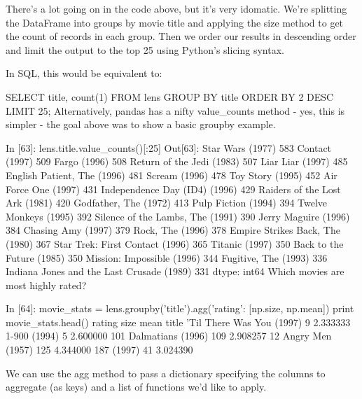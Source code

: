 \documentclass[11pt]{article} %
\begin{document}
There's a lot going on in the code above, but it's very idomatic. We're splitting the DataFrame into groups by movie title and applying the size method to get the count of records in each group. Then we order our results in descending order and limit the output to the top 25 using Python's slicing syntax.

In SQL, this would be equivalent to:

SELECT title, count(1)
FROM lens
GROUP BY title
ORDER BY 2 DESC
LIMIT 25;
Alternatively, pandas has a nifty value_counts method - yes, this is simpler - the goal above was to show a basic groupby example.

In [63]:
lens.title.value_counts()[:25]
Out[63]:
Star Wars (1977)                             583
Contact (1997)                               509
Fargo (1996)                                 508
Return of the Jedi (1983)                    507
Liar Liar (1997)                             485
English Patient, The (1996)                  481
Scream (1996)                                478
Toy Story (1995)                             452
Air Force One (1997)                         431
Independence Day (ID4) (1996)                429
Raiders of the Lost Ark (1981)               420
Godfather, The (1972)                        413
Pulp Fiction (1994)                          394
Twelve Monkeys (1995)                        392
Silence of the Lambs, The (1991)             390
Jerry Maguire (1996)                         384
Chasing Amy (1997)                           379
Rock, The (1996)                             378
Empire Strikes Back, The (1980)              367
Star Trek: First Contact (1996)              365
Titanic (1997)                               350
Back to the Future (1985)                    350
Mission: Impossible (1996)                   344
Fugitive, The (1993)                         336
Indiana Jones and the Last Crusade (1989)    331
dtype: int64
Which movies are most highly rated?

In [64]:
movie_stats = lens.groupby('title').agg({'rating': [np.size, np.mean]})
print movie_stats.head()
                           rating          
                             size      mean
title                                      
'Til There Was You (1997)       9  2.333333
1-900 (1994)                    5  2.600000
101 Dalmatians (1996)         109  2.908257
12 Angry Men (1957)           125  4.344000
187 (1997)                     41  3.024390

We can use the agg method to pass a dictionary specifying the columns to aggregate (as keys) and a list of functions we'd like to apply.
\end{document}
